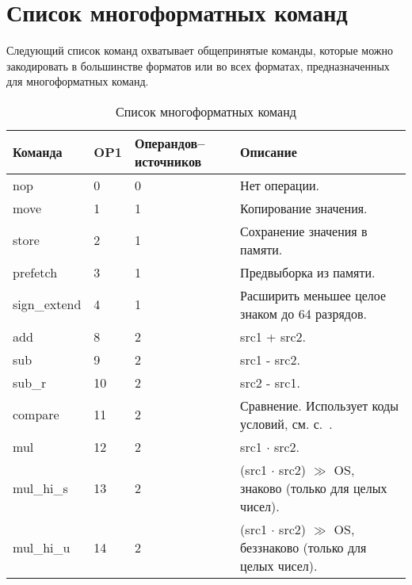 \documentclass[forwardcom.tex]{subfiles}
\begin{document}
\section{Список многоформатных команд}
Следующий список команд охватывает общепринятые команды, которые можно закодировать в большинстве форматов или во всех форматах, предназначенных для многоформатных команд.

\begin{longtable} {|p{18mm}|p{9mm}|p{21mm}|p{95mm}|}
\caption{Список многоформатных команд} 
\label{table:ListOfMultiFormatInstructions} \\
\endfirsthead
\endhead
\hline
\bfseries Команда & \bfseries OP1 & \bfseries Операндов--источников & \bfseries Описание            \\ \hline
nop               &  0           & 0                                & Нет операции.                 \\
move              &  1           & 1                                & Копирование значения.         \\
store             &  2           & 1                                & Сохранение значения в памяти. \\
prefetch          &  3           & 1                                & Предвыборка из памяти.        \\
sign\_extend      &  4           & 1                                & Расширить меньшее целое знаком до 64 разрядов. \\
add               &  8           & 2                                & src1 + src2. \\
sub               &  9           & 2                                & src1 - src2. \\
sub\_r            & 10           & 2                                & src2 - src1. \\
compare           & 11           & 2                                & Сравнение. Использует коды условий, см. с.~\pageref{table:conditionCodesForCompareInstruction}. \\
mul               & 12           & 2                                & src1 $\cdot$ src2. \\ 
mul\_hi\_s        & 13           & 2                                & (src1 $\cdot$ src2) $\gg$ OS, знаково (только для целых чисел). \\
mul\_hi\_u        & 14           & 2                                & (src1 $\cdot$ src2) $\gg$  OS, беззнаково (только для целых чисел). \\

\end{longtable}
\end{document}
